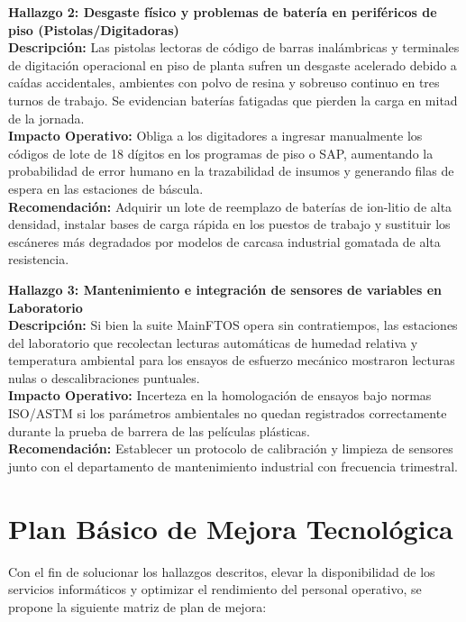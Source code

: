 		\vspace{0.3cm}
		\noindent\textbf{Hallazgo 2: Desgaste físico y problemas de batería en periféricos de piso (Pistolas/Digitadoras)}\\
		\textbf{Descripción:} Las pistolas lectoras de código de barras inalámbricas y terminales de digitación operacional en piso de planta sufren un desgaste acelerado debido a caídas accidentales, ambientes con polvo de resina y sobreuso continuo en tres turnos de trabajo. Se evidencian baterías fatigadas que pierden la carga en mitad de la jornada.\\
		\textbf{Impacto Operativo:} Obliga a los digitadores a ingresar manualmente los códigos de lote de 18 dígitos en los programas de piso o SAP, aumentando la probabilidad de error humano en la trazabilidad de insumos y generando filas de espera en las estaciones de báscula.\\
		\textbf{Recomendación:} Adquirir un lote de reemplazo de baterías de ion-litio de alta densidad, instalar bases de carga rápida en los puestos de trabajo y sustituir los escáneres más degradados por modelos de carcasa industrial gomatada de alta resistencia.
		
		\vspace{0.3cm}
		\noindent\textbf{Hallazgo 3: Mantenimiento e integración de sensores de variables en Laboratorio}\\
		\textbf{Descripción:} Si bien la suite MainFTOS opera sin contratiempos, las estaciones del laboratorio que recolectan lecturas automáticas de humedad relativa y temperatura ambiental para los ensayos de esfuerzo mecánico mostraron lecturas nulas o descalibraciones puntuales.\\
		\textbf{Impacto Operativo:} Incerteza en la homologación de ensayos bajo normas ISO/ASTM si los parámetros ambientales no quedan registrados correctamente durante la prueba de barrera de las películas plásticas.\\
		\textbf{Recomendación:} Establecer un protocolo de calibración y limpieza de sensores junto con el departamento de mantenimiento industrial con frecuencia trimestral.
		
	\section{Plan Básico de Mejora Tecnológica}
		Con el fin de solucionar los hallazgos descritos, elevar la disponibilidad de los servicios informáticos y optimizar el rendimiento del personal operativo, se propone la siguiente matriz de plan de mejora:
		

